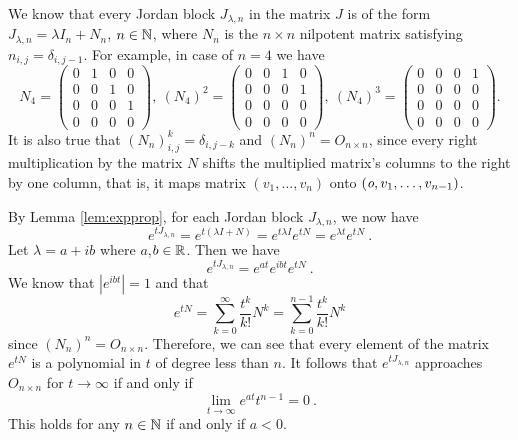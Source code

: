 We know that every Jordan block $J_{\lambda,n}$ in the matrix $J$ is of the form $J_{\lambda,n}=\lambda I_n+N_n$, $n \in\mathbb{N}$, where $N_n$ is the $n \times n$ nilpotent matrix satisfying $n_{i,j}=\delta_{i,j-1}$. For example, in case of $n=4$ we have
\begin{equation*}
	N_4=
	\begin{pmatrix}
		0 & 1 & 0 & 0 \\
		0 & 0 & 1 & 0 \\
		0 & 0 & 0 & 1 \\
		0 & 0 & 0 & 0 
	\end{pmatrix},\ 
	(N_4)^2=
	\begin{pmatrix}
		0 & 0 & 1 & 0 \\
		0 & 0 & 0 & 1 \\
		0 & 0 & 0 & 0 \\
		0 & 0 & 0 & 0 
	\end{pmatrix},\ 
	(N_4)^3=
	\begin{pmatrix}
		0 & 0 & 0 & 1 \\
		0 & 0 & 0 & 0 \\
		0 & 0 & 0 & 0 \\
		0 & 0 & 0 & 0 
	\end{pmatrix}
	.
\end{equation*}
It is also true that $(N_n)^k_{i,j}=\delta_{i,j-k}$ and $(N_n)^n=O_{n \times n}$, since every right multiplication by the matrix $N$ shifts the multiplied matrix's columns to the right by one column, that is, it maps matrix $(v_1,\ldots,v_n)$ onto $(\textit{o},v_1,\ldots,v_{n-1})$. 

By Lemma \ref{lem:expprop}, for each Jordan block $J_{\lambda,n}$, we now have
$$e^{tJ_{\lambda,n}}=e^{t(\lambda I + N)}=e^{t\lambda I}e^{tN}=e^{\lambda t}e^{tN}\ .$$
Let $\lambda = a+ib$ where $a$,$b \in \mathbb{R}$. Then we have
$$e^{tJ_{\lambda,n}}=e^{at}e^{ibt}e^{tN}\ .$$
We know that $|e^{ibt}|=1$ and that
$$e^{tN}=\sum^\infty_{k=0}\frac{t^k}{k!}N^k=\sum^{n-1}_{k=0}\frac{t^k}{k!}N^k$$
since $(N_n)^n=O_{n \times n}$. Therefore, we can see that every element of the matrix $e^{tN}$ is a polynomial in $t$ of degree less than $n$. It follows that $e^{tJ_{\lambda,n}}$ approaches $O_{n \times n}$ for $t\rightarrow\infty$ if and only if
$$\lim_{t\to\infty}e^{at}t^{n-1}=0\ .$$
This holds for any $n\in\mathbb{N}$ if and only if $a<0$. 

